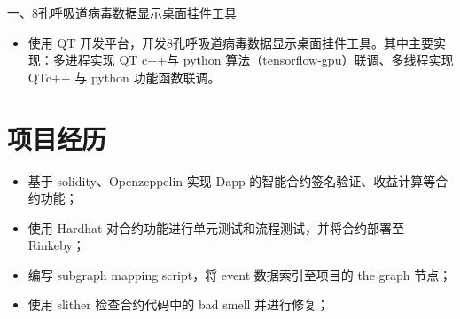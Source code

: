 \documentclass{resume}
\begin{document}
一、8孔呼吸道病毒数据显示桌面挂件工具
\begin{itemize}[parsep=0.5ex]
  \item 使用 QT 开发平台，开发8孔呼吸道病毒数据显示桌面挂件工具。其中主要实现：多进程实现 QT c++与 python 算法（tensorflow-gpu）联调、多线程实现 QTc++ 与 python 功能函数联调。
\end{itemize}

\section{项目经历}

\begin{itemize}[parsep=0.5ex]
  \item 基于 solidity、Openzeppelin 实现 Dapp 的智能合约签名验证、收益计算等合约功能；
  \item 使用 Hardhat 对合约功能进行单元测试和流程测试，并将合约部署至 Rinkeby；
  \item 编写 subgraph mapping script，将 event 数据索引至项目的 the graph 节点；
  \item 使用 slither 检查合约代码中的 bad smell 并进行修复；
\end{itemize}
\end{document}
